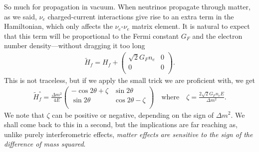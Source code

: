 So much for propagation in vacuum. When neutrinos propagate through matter, as we
said, $\nu_e$ charged-current interactions give rise to an extra term in the Hamiltonian,
which only affects the $\nu_e$-$\nu_e$ matrix element. It is natural to expect that this term
will be proportional to the Fermi constant $G_F$ and the electron number
density---without dragging it too long
\begin{align*}
  \tilde{H}_f = H_f +
  \begin{pmatrix}
  \sqrt{2} G_F n_e & 0\\
  0 & 0\\
\end{pmatrix}.
\end{align*}
This is not traceless, but if we apply the small trick we are proficient with, we
get
\begin{align}\label{eq:msw_hamiltonian_1}
  \tilde{H}^\circ_f = \frac{\Delta m^2}{4E}
  \begin{pmatrix}
   -\cos 2\theta + \zeta & \sin 2\theta\\
   \sin 2\theta & \cos 2\theta - \zeta\\
  \end{pmatrix}
  \quad\text{where}\quad
  \zeta = \frac{2\sqrt{2}G_F n_e E}{\Delta m^2}.
\end{align}
We note that $\zeta$ can be positive or negative, depending on the sign of
$\Delta m^2$. We shall come back to this in a second, but the implications are
far reaching as, unlike purely interferometric effects, \emph{matter effects are
sensitive to the sign of the difference of mass squared}.

